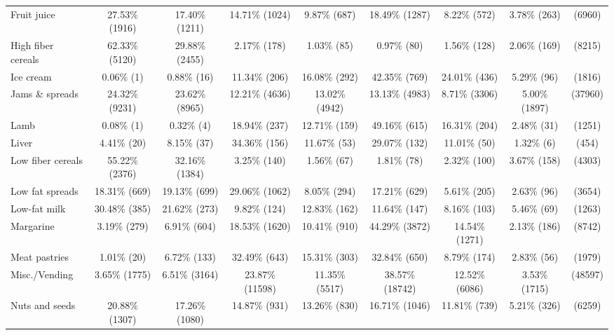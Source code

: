 \documentclass[utf8]{frontiers_suppmat} %
\begin{document}
\begin{table}[]
{\begin{tabular}{@{}lcccccccc@{}}
Fruit juice               & 27.53\%   (1916) & 17.40\%   (1211) & 14.71\%   (1024) & 9.87\%   (687)  & 18.49\%   (1287) & 8.22\%   (572)  & 3.78\%   (263)  &    (6960) \\
High fiber cereals        & 62.33\%   (5120) & 29.88\%   (2455) & 2.17\%    (178)  & 1.03\%    (85)  & 0.97\%     (80)  & 1.56\%   (128)  & 2.06\%   (169)  &    (8215) \\
Ice cream                 & 0.06\%      (1)  & 0.88\%     (16)  & 11.34\%    (206) & 16.08\%   (292) & 42.35\%    (769) & 24.01\%   (436) & 5.29\%    (96)  &    (1816) \\
Jams \& spreads           & 24.32\%   (9231) & 23.62\%   (8965) & 12.21\%   (4636) & 13.02\%  (4942) & 13.13\%   (4983) & 8.71\%  (3306)  & 5.00\%  (1897)  &   (37960) \\
Lamb                      & 0.08\%      (1)  & 0.32\%      (4)  & 18.94\%    (237) & 12.71\%   (159) & 49.16\%    (615) & 16.31\%   (204) & 2.48\%    (31)  &    (1251) \\
Liver                     & 4.41\%     (20)  & 8.15\%     (37)  & 34.36\%    (156) & 11.67\%    (53) & 29.07\%    (132) & 11.01\%    (50) & 1.32\%     (6)  &     (454) \\
Low fiber cereals         & 55.22\%   (2376) & 32.16\%   (1384) & 3.25\%    (140)  & 1.56\%    (67)  & 1.81\%     (78)  & 2.32\%   (100)  & 3.67\%   (158)  &    (4303) \\
Low fat spreads           & 18.31\%    (669) & 19.13\%    (699) & 29.06\%   (1062) & 8.05\%   (294)  & 17.21\%    (629) & 5.61\%   (205)  & 2.63\%    (96)  &    (3654) \\
Low-fat milk              & 30.48\%    (385) & 21.62\%    (273) & 9.82\%    (124)  & 12.83\%   (162) & 11.64\%    (147) & 8.16\%   (103)  & 5.46\%    (69)  &    (1263) \\
Margarine                 & 3.19\%    (279)  & 6.91\%    (604)  & 18.53\%   (1620) & 10.41\%   (910) & 44.29\%   (3872) & 14.54\%  (1271) & 2.13\%   (186)  &    (8742) \\
Meat pastries             & 1.01\%     (20)  & 6.72\%    (133)  & 32.49\%    (643) & 15.31\%   (303) & 32.84\%    (650) & 8.79\%   (174)  & 2.83\%    (56)  &    (1979) \\
Misc./Vending             & 3.65\%   (1775)  & 6.51\%   (3164)  & 23.87\%  (11598) & 11.35\%  (5517) & 38.57\%  (18742) & 12.52\%  (6086) & 3.53\%  (1715)  &   (48597) \\
Nuts and seeds            & 20.88\%   (1307) & 17.26\%   (1080) & 14.87\%    (931) & 13.26\%   (830) & 16.71\%   (1046) & 11.81\%   (739) & 5.21\%   (326)  &    (6259) \\

\end{tabular}}
\end{table}
\end{document}
